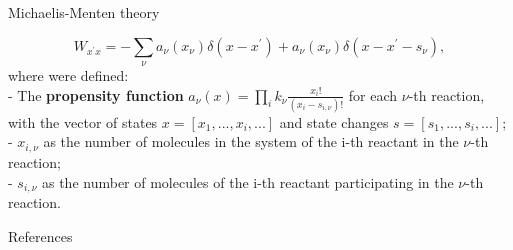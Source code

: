 \documentclass[final]{beamer}
\newlength{\colwidth}
\begin{document}
\begin{frame}[t]
\begin{columns}[t]
\begin{column}{\colwidth}
\begin{block}{Michaelis-Menten theory}
\begin{itemize}
\begin{equation}
W_{x^\prime x} =
-\sum_\nu a_\nu({x}_{\nu}) \delta(x - x^\prime) + a_\nu({x}_{\nu}) \delta(x - x^\prime - s_\nu),
\end{equation}
\vskip-20pt
where were defined:\\
- The {\bf propensity function} $a_\nu({x}) = \prod_i k_\nu \frac{{x}_{i}!}{({x}_{i} - s_{i,\nu})!}$ for each $\nu$-th reaction,  with the vector of states $x = [x_1,...,x_i,...]$ and state changes $s = [s_1,...,s_i,...]$;\\
- ${x}_{i,\nu} $ as the number of molecules in the system of the i-th reactant in the $\nu$-th reaction;\\
- $s_{i,\nu} $ as the number of molecules of the i-th reactant participating in the $\nu$-th reaction.
%
\end{itemize}
\end{block}


\begin{alertblock}{References}

\footnotesize{}


\end{alertblock}
\end{column}
\end{columns}
\end{frame}
\end{document}
